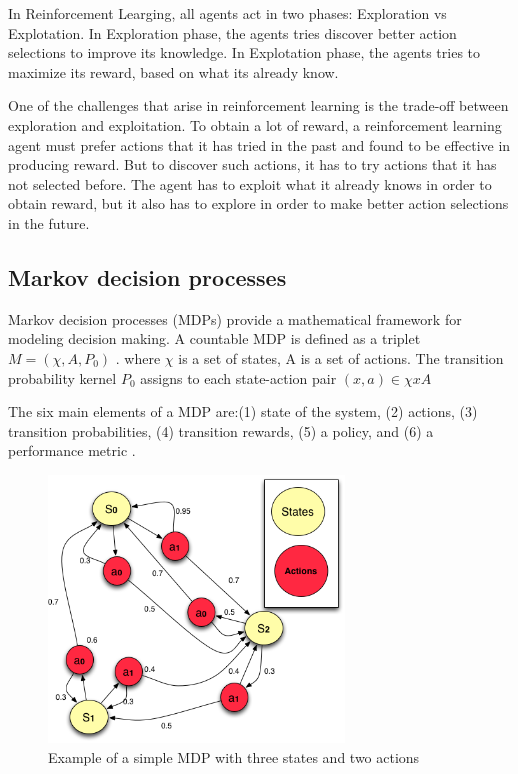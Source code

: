 In Reinforcement Learging, all agents act in two phases: Exploration vs Explotation. In Exploration phase, the agents tries discover better action selections to improve its knowledge. In Explotation phase, the agents tries to maximize its reward, based on what its already know.

One of the challenges that arise in reinforcement learning is the trade-off between exploration and exploitation. To obtain a lot of reward, a reinforcement learning
agent must prefer actions that it has tried in the past and found to be effective in producing reward.
But to discover such actions, it has to try actions that it has not selected before. The agent has to exploit what it already knows in order to obtain reward, but it also has to explore in order to make better action selections in the future.


\subsection{Markov decision processes}

Markov decision processes (MDPs) provide a mathematical framework for modeling decision making. A countable MDP is defined as a triplet $M=(\chi,A,P_{0})$ \cite{Szepesvari2010}. where $\chi$ is a set of states, A is a set of actions. The transition probability kernel $P_{0}$ assigns to each state-action pair $(x, a) \in \chi x A $


The six main elements of a MDP are:(1) state of the system, (2) actions, (3) transition probabilities, (4) transition rewards, (5) a policy, and (6) a performance metric \cite{Sutton2012}.

\begin{figure}
\centering
\includegraphics[width=0.7\textwidth]{./images/mdp1.png}
\caption{Example of a simple MDP with three states and two actions}
\label{fig:mdp}
\end{figure}


